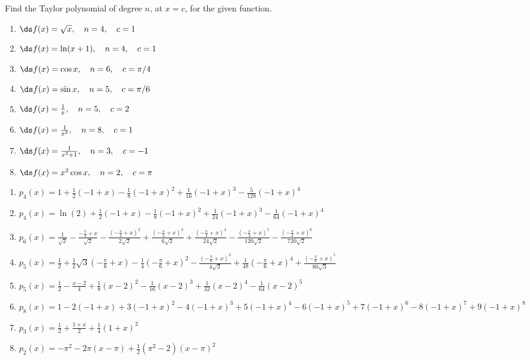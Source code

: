 \begin{enumialphparenastyle}
\begin{ex}
\end{ex}

\begin{ex}
Find the Taylor polynomial of degree $n$, at $x=c$, for the given function.
\begin{enumerate}
\item {$\ds f(x) = \sqrt x, \quad n=4, \quad c=1$
}
\item {$\ds f(x) = \ln (x+1), \quad n=4, \quad c=1$
}
\item {$\ds f(x) = \cos x, \quad n=6, \quad c=\pi/4$
}
\item {$\ds f(x) = \sin x, \quad n=5, \quad c=\pi/6$
}
\item {$\ds f(x) = \frac1x, \quad n=5, \quad c=2$
}
\item  {$\ds f(x) = \frac{1}{x^2}, \quad n=8, \quad c=1$
}
\item {$\ds f(x) = \frac{1}{x^2+1}, \quad n=3, \quad c=-1$
}
\item {$\ds f(x) = x^2\cos x, \quad n=2, \quad c=\pi$
}
\end{enumerate}

\begin{sol}
\begin{enumerate}
\item 
{$p_4(x) = 1+\frac{1}{2} (-1+x)-\frac{1}{8} (-1+x)^2+\frac{1}{16}
   (-1+x)^3-\frac{5}{128} (-1+x)^4$
}
\item 
{$p_4(x) = \ln (2)+\frac{1}{2} (-1+x)-\frac{1}{8}
   (-1+x)^2+\frac{1}{24} (-1+x)^3-\frac{1}{64} (-1+x)^4$
}
\item 
{$p_6(x) = \frac{1}{\sqrt{2}}-\frac{-\frac{\pi
   }{4}+x}{\sqrt{2}}-\frac{\left(-\frac{\pi
   }{4}+x\right)^2}{2 \sqrt{2}}+\frac{\left(-\frac{\pi
   }{4}+x\right)^3}{6 \sqrt{2}}+\frac{\left(-\frac{\pi
   }{4}+x\right)^4}{24 \sqrt{2}}-\frac{\left(-\frac{\pi
   }{4}+x\right)^5}{120 \sqrt{2}}-\frac{\left(-\frac{\pi
   }{4}+x\right)^6}{720 \sqrt{2}}$
}
\item 
{$p_5(x) = \frac{1}{2}+\frac{1}{2} \sqrt{3} \left(-\frac{\pi
   }{6}+x\right)-\frac{1}{4} \left(-\frac{\pi
   }{6}+x\right)^2-\frac{\left(-\frac{\pi }{6}+x\right)^3}{4
   \sqrt{3}}+\frac{1}{48} \left(-\frac{\pi
   }{6}+x\right)^4+\frac{\left(-\frac{\pi
   }{6}+x\right)^5}{80 \sqrt{3}}$
}
\item 
{$p_5(x) = \frac{1}{2}-\frac{x-2}{4}+\frac{1}{8} (x-2)^2-\frac{1}{16}
   (x-2)^3+\frac{1}{32} (x-2)^4-\frac{1}{64} (x-2)^5$
}
\item
{$p_8(x) = 1-2 (-1+x)+3 (-1+x)^2-4 (-1+x)^3+5 (-1+x)^4-6 (-1+x)^5+7
   (-1+x)^6-8 (-1+x)^7+9 (-1+x)^8$
}
\item 
{$p_3(x) =\frac{1}{2}+\frac{1+x}{2}+\frac{1}{4} (1+x)^2$
}
\item 
{$p_2(x) =-\pi ^2-2 \pi  (x-\pi)+\frac{1}{2} \left(\pi ^2-2\right)
   (x-\pi)^2$
}
\end{enumerate}
\end{sol}


\end{ex}
\end{enumialphparenastyle}
